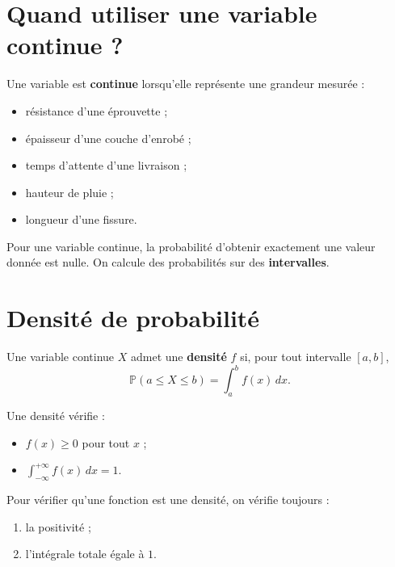 
\section{Quand utiliser une variable continue ?}

Une variable est \textbf{continue} lorsqu'elle représente une grandeur mesurée :
\begin{itemize}
    \item résistance d'une éprouvette ;
    \item épaisseur d'une couche d'enrobé ;
    \item temps d'attente d'une livraison ;
    \item hauteur de pluie ;
    \item longueur d'une fissure.
\end{itemize}

\begin{Rmq}
Pour une variable continue, la probabilité d'obtenir exactement une valeur donnée est nulle. On calcule des probabilités sur des \textbf{intervalles}.
\end{Rmq}

\section{Densité de probabilité}

\begin{Def}
Une variable continue $X$ admet une \textbf{densité} $f$ si, pour tout intervalle $[a,b]$,
$$
\mathbb{P}(a\leq X\leq b)=\int_a^b f(x)\,dx.
$$
\end{Def}

\begin{Prop}
Une densité vérifie :
\begin{itemize}
    \item $f(x)\geq 0$ pour tout $x$ ;
    \item $\int_{-\infty}^{+\infty} f(x)\,dx=1$.
\end{itemize}
\end{Prop}

\begin{Meth}
Pour vérifier qu'une fonction est une densité, on vérifie toujours :
\begin{enumerate}
    \item la positivité ;
    \item l'intégrale totale égale à $1$.
\end{enumerate}
\end{Meth}

